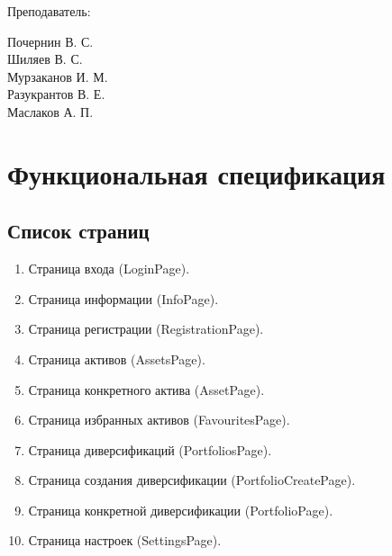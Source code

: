 \documentclass[a4paper, 14pt]{article}
\begin{document}
\begin{titlepage}
\begin{multicols}{2}
\begin{flushright}
            {Преподаватель:\\}

        \end{flushright}
        \begin{flushright}

            {Почернин В. С.}\\
            {Шиляев В. С.}\\
            {Мурзаканов И. М.}\\
            {Разукрантов В. Е.}\\[0.5cm]


            Маслаков А. П.\\

        \end{flushright}
    \end{multicols}

    \flushright{
        {\phantom{qwe}}\\[0.5cm]
    }

    \vfill
\end{titlepage}

\Large
\tableofcontents
\newpage
\large

\section{Функциональная спецификация}

\subsection{Список страниц}

\begin{enumerate}
    \item Страница входа (LoginPage).
    \item Страница информации (InfoPage).
    \item Страница регистрации (RegistrationPage).
    \item Страница активов (AssetsPage).
    \item Страница конкретного актива (AssetPage).
    \item Страница избранных активов (FavouritesPage).
    \item Страница диверсификаций (PortfoliosPage).
    \item Страница создания диверсификации (PortfolioCreatePage).
    \item Страница конкретной диверсификации (PortfolioPage).
    \item Страница настроек (SettingsPage).
\end{enumerate}
\end{document}
